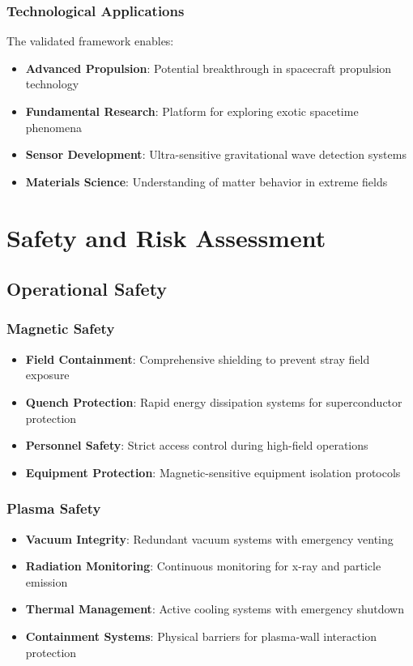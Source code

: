 \documentclass[12pt,a4paper]{article}
\begin{document}
\subsubsection{Technological Applications}
The validated framework enables:
\begin{itemize}
\item \textbf{Advanced Propulsion}: Potential breakthrough in spacecraft propulsion technology
\item \textbf{Fundamental Research}: Platform for exploring exotic spacetime phenomena
\item \textbf{Sensor Development}: Ultra-sensitive gravitational wave detection systems
\item \textbf{Materials Science}: Understanding of matter behavior in extreme fields
\end{itemize}

\section{Safety and Risk Assessment}

\subsection{Operational Safety}

\subsubsection{Magnetic Safety}
\begin{itemize}
\item \textbf{Field Containment}: Comprehensive shielding to prevent stray field exposure
\item \textbf{Quench Protection}: Rapid energy dissipation systems for superconductor protection
\item \textbf{Personnel Safety}: Strict access control during high-field operations
\item \textbf{Equipment Protection}: Magnetic-sensitive equipment isolation protocols
\end{itemize}

\subsubsection{Plasma Safety}
\begin{itemize}
\item \textbf{Vacuum Integrity}: Redundant vacuum systems with emergency venting
\item \textbf{Radiation Monitoring}: Continuous monitoring for x-ray and particle emission
\item \textbf{Thermal Management}: Active cooling systems with emergency shutdown
\item \textbf{Containment Systems}: Physical barriers for plasma-wall interaction protection
\end{itemize}
\end{document}

